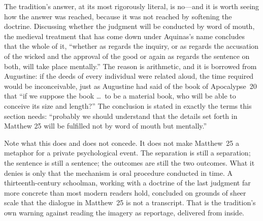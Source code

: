 The tradition's answer, at its most rigorously literal, is no---and it is worth seeing how the answer was reached, because it was not reached by softening the doctrine. Discussing whether the judgment will be conducted by word of mouth, the medieval treatment that has come down under Aquinas's name concludes that the whole of it, ``whether as regards the inquiry, or as regards the accusation of the wicked and the approval of the good or again as regards the sentence on both, will take place mentally.'' The reason is arithmetic, and it is borrowed from Augustine: if the deeds of every individual were related aloud, the time required would be inconceivable, just as Augustine had said of the book of Apocalypse~20 that ``if we suppose the book \ldots\ to be a material book, who will be able to conceive its size and length?'' The conclusion is stated in exactly the terms this section needs: ``probably we should understand that the details set forth in Matthew 25 will be fulfilled not by word of mouth but mentally.''

Note what this does and does not concede. It does not make Matthew~25 a metaphor for a private psychological event. The separation is still a separation; the sentence is still a sentence; the outcomes are still the two outcomes. What it denies is only that the mechanism is oral procedure conducted in time. A thirteenth-century schoolman, working with a doctrine of the last judgment far more concrete than most modern readers hold, concluded on grounds of sheer scale that the dialogue in Matthew~25 is not a transcript. That is the tradition's own warning against reading the imagery as reportage, delivered from inside.


